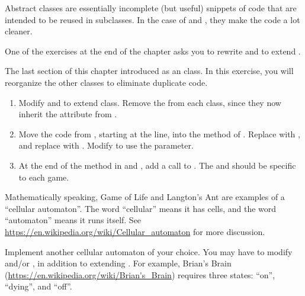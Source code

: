 Abstract classes are essentially incomplete (but useful) snippets of code that are intended to be reused in subclasses.
In the case of  and , they make the code a lot cleaner.

One of the exercises at the end of the chapter asks you to rewrite  and  to extend .



\begin{exercise}
The last section of this chapter introduced  as an  class.
In this exercise, you will reorganize the other classes to eliminate duplicate code.

\begin{enumerate}

\item Modify  and  to extend  class.
Remove the  from each class, since they now inherit the  attribute from .

\item Move the code from , starting at the  line, into the  method of .
Replace  with , and replace  with .
Modify  to use the  parameter.

\item At the end of the  method in  and , add a call to .
The  and  should be specific to each game.

\end{enumerate}

\end{exercise}


\begin{exercise}
Mathematically speaking, Game of Life and Langton's Ant are examples of a ``cellular automaton''.
The word ``cellular'' means it has cells, and the word ``automaton'' means it runs itself.
See \url{https://en.wikipedia.org/wiki/Cellular_automaton} for more discussion.

Implement another cellular automaton of your choice.
You may have to modify  and/or , in addition to extending .
For example, Brian's Brain (\url{https://en.wikipedia.org/wiki/Brian's_Brain}) requires three states: ``on'', ``dying'', and ``off''.
\end{exercise}
